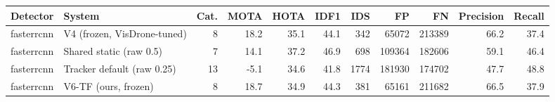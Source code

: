 \begin{tabular}{llrrrrrrrrr}
\toprule
Detector & System & Cat. & MOTA & HOTA & IDF1 & IDS & FP & FN & Precision & Recall \\
\midrule
fasterrcnn & V4 (frozen, VisDrone-tuned) & 8 & 18.2 & 35.1 & 44.1 & 342 & 65072 & 213389 & 66.2 & 37.4 \\
fasterrcnn & Shared static (raw 0.5) & 7 & 14.1 & 37.2 & 46.9 & 698 & 109364 & 182606 & 59.1 & 46.4 \\
fasterrcnn & Tracker default (raw 0.25) & 13 & -5.1 & 34.6 & 41.8 & 1774 & 181930 & 174702 & 47.7 & 48.8 \\
fasterrcnn & V6-TF (ours, frozen) & 8 & 18.7 & 34.9 & 44.3 & 381 & 65161 & 211682 & 66.5 & 37.9 \\
\bottomrule
\end{tabular}
